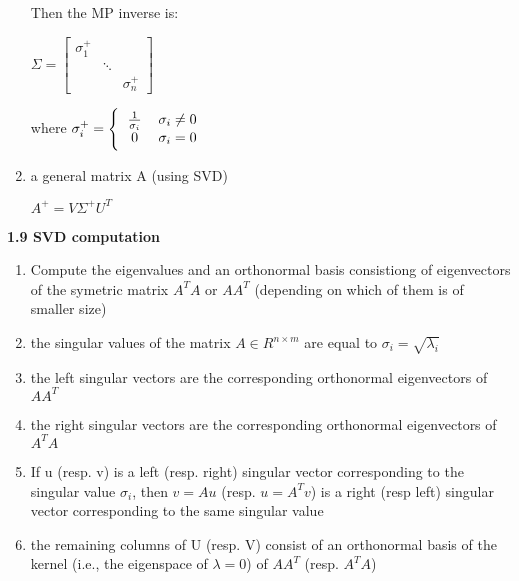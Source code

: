 \documentclass{article}
\begin{document}
\begin{multicols}{2}
\begin{enumerate}
\begin{center}
\begin{math}
            \end{math}
        \end{center}
        Then the MP inverse is:
        \begin{center}
            \begin{math}
                \Sigma =
                \begin{bmatrix}
                    \sigma_1^+ &        & \\
                               & \ddots & \\
                               &        & \sigma_n^+
                \end{bmatrix}
            \end{math}
        \end{center}
        where \begin{math}
            \sigma_i^+ =
            \Bigg \{\begin{tabular}{ccc}
                $\frac{1}{\sigma_i}$  & $\sigma_i \neq 0$ & \\
                $0$                   & $\sigma_i = 0$ & \\
            \end{tabular}
        \end{math}
    \item a general matrix A (using SVD)
        \begin{center}
            \begin{math}
                A^+ = V \Sigma^+ U^T
            \end{math}
        \end{center}
\end{enumerate}

\textbf{1.9 SVD computation}
\begin{enumerate}
    \item Compute the eigenvalues and an orthonormal basis consistiong of eigenvectors
        of the symetric matrix $A^TA$ or $AA^T$ (depending on which of them is of smaller size)
    \item the singular values of the matrix $A \in R^{n \times m}$ are equal to $\sigma_i = \sqrt{\lambda_i}$
    \item the left singular vectors are the corresponding orthonormal eigenvectors of $AA^T$
    \item the right singular vectors are the corresponding orthonormal eigenvectors of $A^TA$
    \item If u (resp. v) is a left (resp. right) singular vector corresponding to the singular
        value $\sigma_i$, then $v = Au$ (resp. $u = A^Tv$) is a right (resp left) singular
        vector corresponding to the same singular value
    \item the remaining columns of U (resp. V) consist of an orthonormal basis of the kernel
        (i.e., the eigenspace of $\lambda = 0$) of $AA^T$ (resp. $A^TA$)
\end{enumerate}


\end{multicols}
\end{document}
